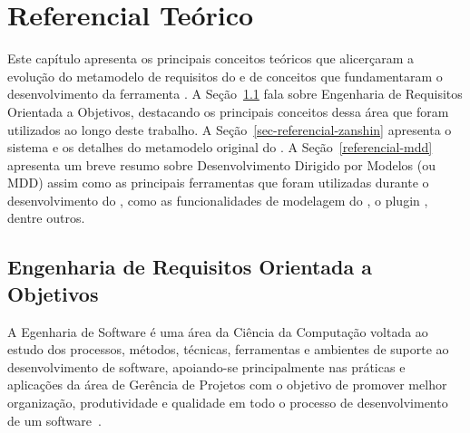 \chapter{Referencial Teórico}
\label{sec-referencial}

Este capítulo apresenta os principais conceitos teóricos que alicerçaram a evolução do metamodelo de requisitos do \zanshin e de conceitos que fundamentaram o desenvolvimento da ferramenta \unagi. A Seção~\ref{sec-referencial-engenharia-objetivos} fala sobre Engenharia de Requisitos Orientada a Objetivos, destacando os principais conceitos dessa área que foram utilizados ao longo deste trabalho. A Seção~\ref{sec-referencial-zanshin} apresenta o sistema \zanshin e os detalhes do metamodelo original do \framework. A Seção~\ref{referencial-mdd} apresenta um breve resumo sobre Desenvolvimento Dirigido por Modelos (\mdd ou MDD) assim como  as principais ferramentas que foram utilizadas durante o desenvolvimento do \unagi, como as funcionalidades \emf de modelagem do \eclipse, o plugin \sirius, dentre outros.



\section{Engenharia de Requisitos Orientada a Objetivos}
\label{sec-referencial-engenharia-objetivos}

A Egenharia de Software é uma área da Ciência da Computação voltada ao estudo dos processos, métodos, técnicas, ferramentas e ambientes de suporte ao desenvolvimento de software, apoiando-se principalmente nas práticas e aplicações da área de Gerência de Projetos com o objetivo de promover melhor organização, produtividade e qualidade em todo o processo de desenvolvimento de um software~\cite{falboEngSoft}.


